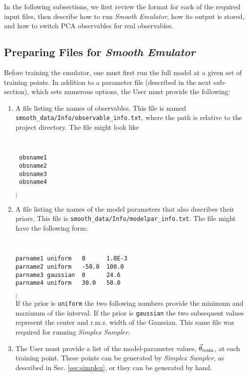 \documentclass[UserManual.tex]{subfiles}
\begin{document}
In the following subsections, we first review the format for each of the required input files, then describe how to run {\it Smooth Emulator}, how its output is stored, and how to switch PCA observables for real observables.

\subsection{Preparing Files for {\it Smooth Emulator}}

Before training the emulator, one must first run the full model at a given set of training points. In addition to a parameter file (described in the next sub-section), which sets numerous options, the User must provide the following:
\begin{enumerate}\itemsep=0pt
\item A file listing the names of observables. This file is named\\{\tt smooth\_data/Info/observable\_info.txt}, where the path is relative to the project directory. The file might look like
{\tt
\begin{verbatim}
 obsname1 
 obsname2
 obsname3
 obsname4  
\end{verbatim}}
\vspace*{-16pt}
 \hspace*{28pt}$\vdots$\\

\item A file listing the names of the model parameters that also describes their priors. This file is {\tt smooth\_data/Info/modelpar\_info.txt}. The file might have the following form:
{\tt
\begin{verbatim}
parname1 uniform   0      1.0E-3
parname2 uniform   -50.0  100.0
parname3 gaussian  0      24.6
parname4 uniform   30.0   50.0
\end{verbatim}}
\vspace*{-16pt}
 \hspace*{28pt}$\vdots$\\
If the prior is {\tt uniform} the two following numbers provide the minimum and maximum of the interval. If the prior is {\tt gaussian} the two subsequent values represent the center and r.m.s. width of the Gaussian. This same file was required for running {\it Simplex Sampler}.

\item The User must provide a list of the model-parameter values, $\vec{\theta}_{\rm train}$, at each training point. These points can be generated by {\it Simplex Sampler}, as described in Sec. \ref{sec:simplex}, or they can be generated by hand.


\end{enumerate}
\end{document}
